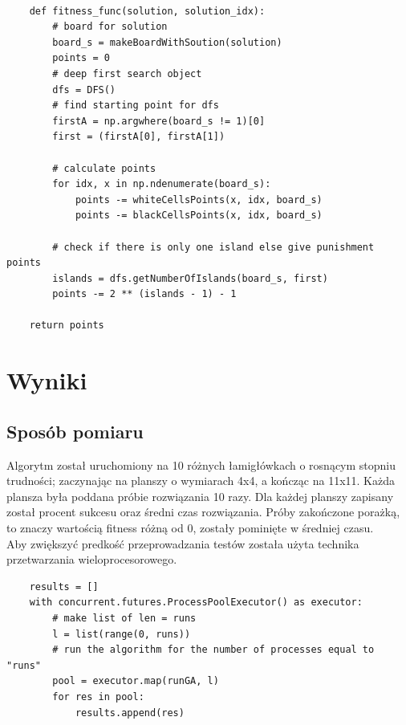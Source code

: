 \documentclass{article}
\begin{document}
\begin{verbatim}

    def fitness_func(solution, solution_idx):
        # board for solution
        board_s = makeBoardWithSoution(solution)
        points = 0
        # deep first search object
        dfs = DFS()
        # find starting point for dfs
        firstA = np.argwhere(board_s != 1)[0]
        first = (firstA[0], firstA[1])

        # calculate points
        for idx, x in np.ndenumerate(board_s):
            points -= whiteCellsPoints(x, idx, board_s)
            points -= blackCellsPoints(x, idx, board_s)

        # check if there is only one island else give punishment points
        islands = dfs.getNumberOfIslands(board_s, first)
        points -= 2 ** (islands - 1) - 1

    return points
\end{verbatim}

\section{Wyniki}

\subsection{Sposób pomiaru}
Algorytm został uruchomiony na 10 różnych łamigłówkach o rosnącym stopniu trudności; zaczynając na planszy o wymiarach 4x4, a kończąc na 11x11. Każda plansza była poddana próbie rozwiązania 10 razy. Dla każdej planszy zapisany został procent sukcesu oraz średni czas rozwiązania. Próby zakończone porażką, to znaczy wartością fitness różną od 0, zostały pominięte w średniej czasu.\\
\newline
Aby zwiększyć predkość przeprowadzania testów została użyta technika przetwarzania wieloprocesorowego.

\begin{verbatim}
    results = []
    with concurrent.futures.ProcessPoolExecutor() as executor:
        # make list of len = runs
        l = list(range(0, runs))
        # run the algorithm for the number of processes equal to "runs"
        pool = executor.map(runGA, l)
        for res in pool:
            results.append(res)
\end{verbatim}
\end{document}
